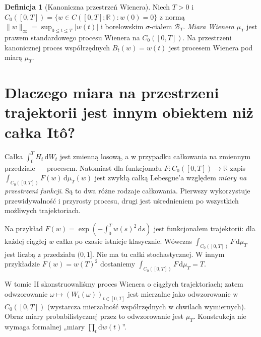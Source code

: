 \documentclass[11pt,a4paper,oneside]{report}
\numberwithin{equation}{chapter}
\theoremstyle{plain}
\theoremstyle{definition}
\newtheorem{definicja}{Definicja}[chapter]
\theoremstyle{remark}
\newcommand{\R}{\mathbb{R}}
\newcommand{\dd}{\mathrm{d}}
\begin{document}
\begin{definicja}[Kanoniczna przestrzeń Wienera]\label{def:volIII:09:01}
\label{def:canonical-wiener}
Niech $T>0$ i
$C_0([0,T])=\{w\in C([0,T];\R):w(0)=0\}$ z normą
$\|w\|_\infty=\sup_{0\le t\le T}|w(t)|$ i
borelowskim $\sigma$-ciałem $\mathcal B_T$.
\emph{Miara Wienera} $\mu_T$ jest prawem standardowego procesu Wienera
na $C_0([0,T])$. Na przestrzeni kanonicznej proces współrzędnych
$B_t(w)=w(t)$ jest procesem Wienera pod miarą $\mu_T$.
\end{definicja}



\section{Dlaczego miara na przestrzeni trajektorii jest innym obiektem niż całka Itô?}\label{sec:volIII:09:01}

Całka $\int_0^T H_t\,\dd W_t$ jest zmienną losową, a w przypadku
całkowania na zmiennym przedziale --- procesem. Natomiast dla funkcjonału
$F:C_0([0,T])\to\R$ zapis $\int_{C_0([0,T])} F(w)\,\dd\mu_T(w)$ jest zwykłą całką
Lebesgue'a względem \emph{miary na przestrzeni funkcji}. Są to dwa
różne rodzaje całkowania. Pierwszy wykorzystuje przewidywalność i przyrosty
procesu, drugi jest uśrednieniem po wszystkich możliwych trajektoriach.

Na przykład $F(w)=\exp(-\int_0^T w(s)^2\,\dd s)$ jest funkcjonałem
trajektorii: dla każdej ciągłej $w$ całka po czasie istnieje klasycznie.
Wówczas $\int_{C_0([0,T])} F\,\dd\mu_T$ jest liczbą z przedziału $(0,1]$.
Nie ma tu całki stochastycznej. W innym przykładzie
$F(w)=w(T)^2$ dostaniemy $\int_{C_0([0,T])} F\,\dd\mu_T=T$.



W tomie II skonstruowaliśmy proces Wienera o ciągłych trajektoriach;
zatem odwzorowanie $\omega\mapsto(W_t(\omega))_{t\in[0,T]}$ jest
mierzalne jako odwzorowanie w $C_0([0,T])$ (wystarcza mierzalność
współrzędnych w chwilach wymiernych). Obraz miary probabilistycznej
przez to odwzorowanie jest $\mu_T$. Konstrukcja nie wymaga formalnej
„miary $\prod_t\dd w(t)$”.
\end{document}
